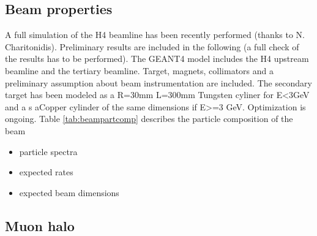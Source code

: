 \subsection{Beam properties}
A full simulation of the H4 beamline has been recently performed (thanks to N. Charitonidis). Preliminary results are included in the following (a full check of the results has to be performed).
The GEANT4 model includes the H4 upstream beamline and the tertiary beamline.  Target, magnets, collimators and a preliminary assumption about beam instrumentation are included. The secondary target has been modeled as a R=30mm L=300mm Tungsten cyliner for   E<3GeV and a s aCopper cylinder of the same dimensions  if E>=3 GeV. Optimization is ongoing.
Table \ref{tab:beampartcomp} describes the particle composition of the beam  
\begin{itemize}
\item particle spectra
\item expected rates
\item expected beam dimensions 
\end{itemize}

\subsection{Muon halo}




